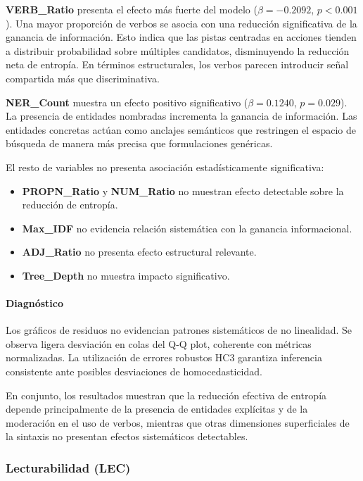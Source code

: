 \documentclass[../main.tex]{subfiles}
\begin{document}
\textbf{VERB\_Ratio} presenta el efecto más fuerte del modelo ($\beta = -0.2092$, $p < 0.001$). Una mayor proporción de verbos se asocia con una reducción significativa de la ganancia de información. Esto indica que las pistas centradas en acciones tienden a distribuir probabilidad sobre múltiples candidatos, disminuyendo la reducción neta de entropía. En términos estructurales, los verbos parecen introducir señal compartida más que discriminativa.

\textbf{NER\_Count} muestra un efecto positivo significativo ($\beta = 0.1240$, $p = 0.029$). La presencia de entidades nombradas incrementa la ganancia de información. Las entidades concretas actúan como anclajes semánticos que restringen el espacio de búsqueda de manera más precisa que formulaciones genéricas.

El resto de variables no presenta asociación estadísticamente significativa:

\begin{itemize}
\item \textbf{PROPN\_Ratio} y \textbf{NUM\_Ratio} no muestran efecto detectable sobre la reducción de entropía.
\item \textbf{Max\_IDF} no evidencia relación sistemática con la ganancia informacional.
\item \textbf{ADJ\_Ratio} no presenta efecto estructural relevante.
\item \textbf{Tree\_Depth} no muestra impacto significativo.
\end{itemize}

\paragraph{Diagnóstico}

Los gráficos de residuos no evidencian patrones sistemáticos de no linealidad. Se observa ligera desviación en colas del Q-Q plot, coherente con métricas normalizadas. La utilización de errores robustos HC3 garantiza inferencia consistente ante posibles desviaciones de homocedasticidad.

En conjunto, los resultados muestran que la reducción efectiva de entropía depende principalmente de la presencia de entidades explícitas y de la moderación en el uso de verbos, mientras que otras dimensiones superficiales de la sintaxis no presentan efectos sistemáticos detectables.

\subsubsection{Lecturabilidad (LEC)}
\end{document}
